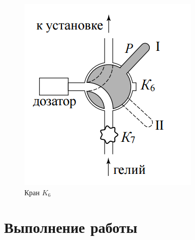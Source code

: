 \documentclass{article}
\begin{document}
\begin{enumerate}
\begin{figure}[h]
    \centering
    \includegraphics[width=5.5 cm]{crane.PNG}
    \caption{Кран $K_6$}
    \label{fig:vac}
\end{figure} 

\end{enumerate}

\section {Выполнение работы}
\end{document}
